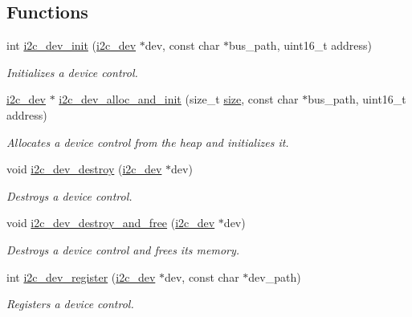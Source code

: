 \subsection*{Functions}
\begin{DoxyCompactItemize}
\item 
int \mbox{\hyperlink{group__I2CDevice_ga240da9c0f736698756528ac98b790ca8}{i2c\+\_\+dev\+\_\+init}} (\mbox{\hyperlink{structi2c__dev}{i2c\+\_\+dev}} $\ast$dev, const char $\ast$bus\+\_\+path, uint16\+\_\+t address)
\begin{DoxyCompactList}\small\item\em Initializes a device control. \end{DoxyCompactList}\item 
\mbox{\hyperlink{structi2c__dev}{i2c\+\_\+dev}} $\ast$ \mbox{\hyperlink{group__I2CDevice_gaaa52883fe2313442f1172eb5f4de1215}{i2c\+\_\+dev\+\_\+alloc\+\_\+and\+\_\+init}} (size\+\_\+t \mbox{\hyperlink{sun4u_2tte_8h_a245260f6f74972558f61b85227df5aae}{size}}, const char $\ast$bus\+\_\+path, uint16\+\_\+t address)
\begin{DoxyCompactList}\small\item\em Allocates a device control from the heap and initializes it. \end{DoxyCompactList}\item 
void \mbox{\hyperlink{group__I2CDevice_ga2ed20633d6ded213b3f06ca56db211c6}{i2c\+\_\+dev\+\_\+destroy}} (\mbox{\hyperlink{structi2c__dev}{i2c\+\_\+dev}} $\ast$dev)
\begin{DoxyCompactList}\small\item\em Destroys a device control. \end{DoxyCompactList}\item 
void \mbox{\hyperlink{group__I2CDevice_gabb0478e95d721b85cc8e06bd2be89559}{i2c\+\_\+dev\+\_\+destroy\+\_\+and\+\_\+free}} (\mbox{\hyperlink{structi2c__dev}{i2c\+\_\+dev}} $\ast$dev)
\begin{DoxyCompactList}\small\item\em Destroys a device control and frees its memory. \end{DoxyCompactList}\item 
int \mbox{\hyperlink{group__I2CDevice_ga917604be9f6cfaa0e4d7a9302e873d16}{i2c\+\_\+dev\+\_\+register}} (\mbox{\hyperlink{structi2c__dev}{i2c\+\_\+dev}} $\ast$dev, const char $\ast$dev\+\_\+path)
\begin{DoxyCompactList}\small\item\em Registers a device control. \end{DoxyCompactList}\end{DoxyCompactItemize}


